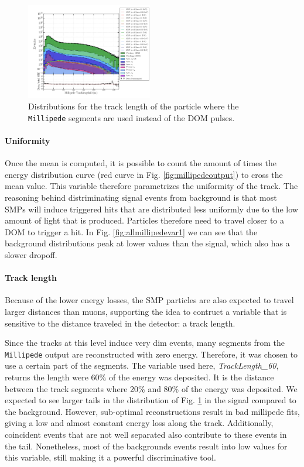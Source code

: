 \begin{figure}
\centering
\includegraphics[width=0.49\textwidth]{chapter8/img/1D_stack_millipede_tracklength60.png}
\caption{Distributions for the track length of the particle where the \texttt{Millipede} segments are used instead of the DOM pulses.}
\label{fig:allmillipedevar2}
\end{figure}

\paragraph{Uniformity}
Once the mean is computed, it is possible to count the amount of times the energy distribution curve (red curve in Fig. \ref{fig:millipedeoutput}) to cross the mean value. This variable therefore parametrizes the uniformity of the track. The reasoning behind distriminating signal events from background is that most SMPs will induce triggered hits that are distributed less uniformly due to the low amount of light that is produced. Particles therefore need to travel closer to a DOM to trigger a hit. In Fig. \ref{fig:allmillipedevar1} we can see that the background distributions peak at lower values than the signal, which also has a slower dropoff. 

\paragraph{Track length}
Because of the lower energy losses, the SMP particles are also expected to travel larger distances than muons, supporting the idea to contruct a variable that is sensitive to the distance traveled in the detector: a track length.

Since the tracks at this level induce very dim events, many segments from the \texttt{Millipede} output are reconstructed with zero energy. Therefore, it was chosen to use a certain part of the segments. The variable used here, \textit{TrackLength\_60}, returns the length were 60\% of the energy was deposited. It is the distance between the track segments where 20\% and 80\% of the energy was deposited. We expected to see larger tails in the distribution of Fig. \ref{fig:allmillipedevar2} in the signal compared to the background. However, sub-optimal reconstructions result in bad millipede fits, giving a low and almost constant energy loss along the track. Additionally, coincident events that are not well separated also contribute to these events in the tail. Nonetheless, most of the backgrounds events result into low values for this variable, still making it a powerful discriminative tool. 

